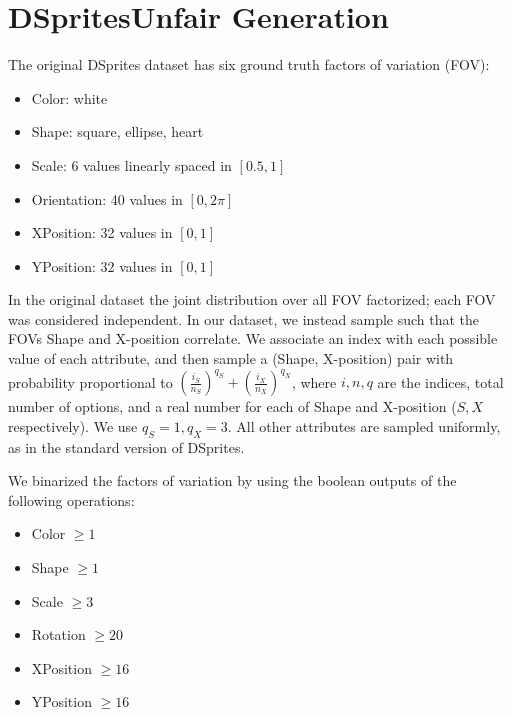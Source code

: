 \section{DSpritesUnfair Generation} \label{sec:dsprites-generation}
The original DSprites dataset has six ground truth factors of variation (FOV): 
\begin{itemize}
    \item Color: white
    \item Shape: square, ellipse, heart
    \item Scale: 6 values linearly spaced in $[0.5, 1]$
    \item Orientation: 40 values in $[0, 2\pi]$
    \item XPosition: 32 values in $[0, 1]$
    \item YPosition: 32 values in $[0, 1]$
\end{itemize}

In the original dataset the joint distribution over all FOV factorized; each FOV was considered independent.
In our dataset, we instead sample such that the FOVs Shape and X-position correlate.
We associate an index with each possible value of each attribute, and then sample a (Shape, X-position) pair with probability proportional to $(\frac{i_S}{n_S})^{q_S} + (\frac{i_X}{n_X})^{q_X}$, where $i, n, q$ are the indices, total number of options, and a real number for each of Shape and X-position ($S, X$ respectively).
We use $q_S = 1, q_X = 3$. 
All other attributes are sampled uniformly, as in the standard version of DSprites.

We binarized the factors of variation by using the boolean outputs of the following operations:
\begin{itemize}
    \item Color $\geq 1$
    \item Shape $\geq 1$
    \item Scale $\geq 3$
    \item Rotation $\geq 20$
    \item XPosition $\geq 16$
    \item YPosition $\geq 16$
\end{itemize}

